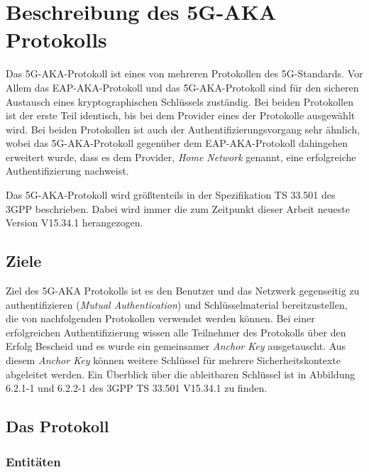 \chapter{Beschreibung des 5G-AKA Protokolls}
\label{chap:2}

Das 5G-AKA-Protokoll ist eines von mehreren Protokollen des 5G-Standards.
Vor Allem das EAP-AKA-Protokoll und das 5G-AKA-Protokoll sind für den sicheren Austausch eines kryptographischen Schlüssels zuständig. 
Bei beiden Protokollen ist der erste Teil identisch, bis bei dem Provider eines der Protokolle ausgewählt wird. %
Bei beiden Protokollen ist auch der Authentifizierungsvorgang sehr ähnlich, wobei das 5G-AKA-Protokoll gegenüber dem EAP-AKA-Protokoll dahingehen erweitert wurde, dass es dem Provider, \textit{Home Network} genannt, eine erfolgreiche Authentifizierung nachweist. %

Das 5G-AKA-Protokoll wird größtenteils in der Spezifikation TS 33.501 des 3GPP beschrieben. %
Dabei wird immer die zum Zeitpunkt dieser Arbeit neueste Version V15.34.1 herangezogen.

\section{Ziele}

Ziel des 5G-AKA Protokolls ist es den Benutzer und das Netzwerk gegenseitig zu authentifizieren (\textit{Mutual Authentication}) und Schlüsselmaterial bereitzustellen, die von nachfolgenden Protokollen verwendet werden können. %
Bei einer erfolgreichen Authentifizierung wissen alle Teilnehmer des Protokolls über den Erfolg Bescheid und es wurde ein gemeinsamer \textit{Anchor Key} ausgetauscht.
Aus diesem \textit{Anchor Key} können weitere Schlüssel für mehrere Sicherheitskontexte abgeleitet werden.
Ein Überblick über die ableitbaren Schlüssel ist in Abbildung 6.2.1-1 und 6.2.2-1 des 3GPP TS 33.501 V15.34.1 zu finden. %

\section{Das Protokoll}

\subsection{Entitäten}%

